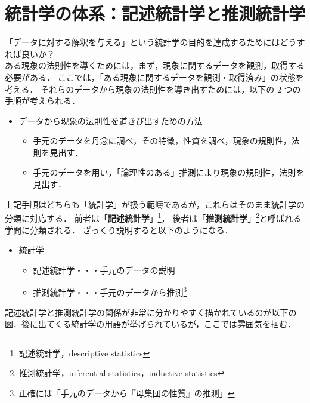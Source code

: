 \newpage

\section{統計学の体系：記述統計学と推測統計学}

「データに対する解釈を与える」という統計学の目的を達成するためにはどうすれば良いか？\\

ある現象の法則性を導くためには，まず，現象に関するデータを観測，取得する必要がある．
ここでは，「ある現象に関するデータを観測・取得済み」の状態を考える．
それらのデータから現象の法則性を導き出すためには，以下の 2 つの手順が考えられる．

\begin{itemize}
  \item データから現象の法則性を道きび出すための方法
        \begin{itemize}
          \item 手元のデータを丹念に調べ，その特徴，性質を調べ，現象の規則性，法則を見出す．
          \item 手元のデータを用い，「論理性のある」推測により現象の規則性，法則を見出す．
        \end{itemize}
\end{itemize}


上記手順はどちらも「統計学」が扱う範疇であるが，これらはそのまま統計学の分類に対応する．
前者は「\textbf{記述統計学}」\footnote{記述統計学，descriptive statistics}，
後者は「\textbf{推測統計学}」\footnote{推測統計学，inferential statistics，inductive statistics}と呼ばれる学問に分類される．
ざっくり説明すると以下のようになる．

\begin{itemize}
  \item 統計学
        \begin{itemize}
          \item 記述統計学・・・手元のデータの説明
          \item 推測統計学・・・手元のデータから推測\footnote{正確には「手元のデータから『母集団の性質』の推測」}
        \end{itemize}
\end{itemize}

記述統計学と推測統計学の関係が非常に分かりやすく描かれているのが以下の図．後に出てくる統計学の用語が挙げられているが，ここでは雰囲気を掴む．


